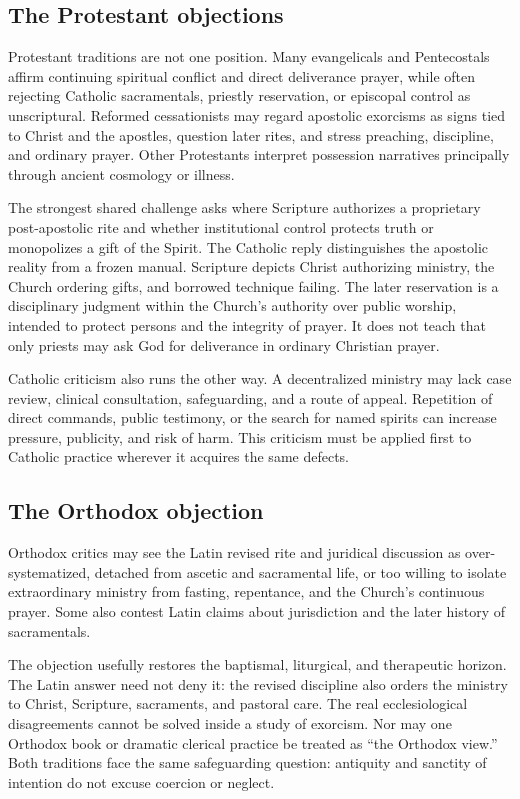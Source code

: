 \subsection{The Protestant objections}

Protestant traditions are not one position. Many evangelicals and
Pentecostals affirm continuing spiritual conflict and direct deliverance
prayer, while often rejecting Catholic sacramentals, priestly reservation, or
episcopal control as unscriptural. Reformed cessationists may regard apostolic
exorcisms as signs tied to Christ and the apostles, question later rites, and
stress preaching, discipline, and ordinary prayer. Other Protestants interpret
possession narratives principally through ancient cosmology or illness.

The strongest shared challenge asks where Scripture authorizes a proprietary
post-apostolic rite and whether institutional control protects truth or
monopolizes a gift of the Spirit. The Catholic reply distinguishes the
apostolic reality from a frozen manual. Scripture depicts Christ authorizing
ministry, the Church ordering gifts, and borrowed technique failing. The
later reservation is a disciplinary judgment within the Church's authority
over public worship, intended to protect persons and the integrity of prayer.
It does not teach that only priests may ask God for deliverance in ordinary
Christian prayer.

Catholic criticism also runs the other way. A decentralized ministry may lack
case review, clinical consultation, safeguarding, and a route of appeal.
Repetition of direct commands, public testimony, or the search for named
spirits can increase pressure, publicity, and risk of harm. This criticism must be applied
first to Catholic practice wherever it acquires the same defects.

\subsection{The Orthodox objection}

Orthodox critics may see the Latin revised rite and juridical discussion as
over-systematized, detached from ascetic and sacramental life, or too willing
to isolate extraordinary ministry from fasting, repentance, and the Church's
continuous prayer. Some also contest Latin claims about jurisdiction and the
later history of sacramentals.

The objection usefully restores the baptismal, liturgical, and therapeutic
horizon. The Latin answer need not deny it: the revised discipline also orders
the ministry to Christ, Scripture, sacraments, and pastoral care. The real
ecclesiological disagreements cannot be solved inside a study of exorcism.
Nor may one Orthodox book or dramatic clerical practice be treated as
``the Orthodox view.'' Both traditions face the same safeguarding question:
antiquity and sanctity of intention do not excuse coercion or neglect.

